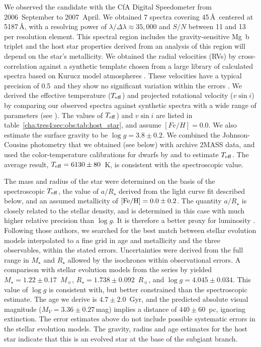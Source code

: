 We observed the candidate with the CfA Digital Speedometer \citep{Latham:ASP:1992a} from 2006~September to 2007~April. 
We obtained 7 spectra covering 45\,\AA\ centered 
at 5187\,\AA, with a resolving power of 
$\lambda/\Delta\lambda \approx 35,\!000$ and $S/N$ between 11 and 13 per resolution element. 
This spectral region includes the gravity-sensitive Mg~b triplet and the host star properties derived from an analysis of this region will depend on the star's metallicity. 
We obtained the radial velocities (RVs) by 
cross-correlation against a synthetic template chosen from a large library of 
calculated spectra based on Kurucz model atmospheres 
\citep[see][]{Nordstroem_Latham_Morse:aa:1994a, Latham_Stefanik_Torres:aj:2002a}. 
These velocities have a typical precision of 
0.5~\kms and they show no significant variation within the errors
. We derived the effective temperature ($T_{\rm eff}$) and projected rotational velocity ($v\sin{i}$) by comparing our observed spectra against synthetic spectra with a wide range of parameters (see \citealt*{Torres_Neuhauser_Guenther:aj:2002a}). The values of $T_{\rm eff}$) and $v \sin i$ are listed in table~\ref{cha:tres4:sec:obs:tab:host_star}, and assume $[Fe/H]=0.0$. We also estimate the surface gravity to be \mbox{$\log g = 3.8 \pm 0.2$}. 
We combined the Johnson-Cousins photometry that we obtained (see 
below) with archive 2MASS data, and used the 
color-temperature calibrations for dwarfs by \citet{Ramirez_Melendez:apj:2005b} and \citet*{Casagrande_Portinari_Flynn:mnras:2006a} to estimate 
$T_{\rm eff}$. The average result, $T_{\rm eff} = 6130 \pm 80$~K, 
is consistent with the spectroscopic value.

The mass and radius of the star were determined on the basis of the spectroscopic $T_{\rm eff}$, 
the value of $a/R_{\star}$ derived from the light curve fit described below, and 
an assumed metallicity of $\left [ {\rm Fe/H} \right ] = 0.0 \pm 0.2$. The 
quantity $a/R_{\star}$ is closely related to the stellar density, and is 
determined in this case with much higher relative precision than $\log g$. It 
is therefore a better proxy for luminosity \citep[see][]{Sozzetti_Torres_Charbonneau:apj:2007a}. 
Following those authors, we searched for the best match between stellar evolution models interpolated to a fine grid in age and metallicity and the three observables, 
within the stated errors. 
Uncertainties were derived from the full range in $M_\star$ and $R_\star$ allowed by the isochrones within observational errors.
A comparison with stellar evolution models from the series by \citet{Yi_Demarque_Kim:apjs:2001a} yielded \mbox{$M_{\star} = 1.22 \pm 0.17$~$M_{\sun}$}, \mbox{$R_{\star} = 1.738 \pm 0.092$~$R_{\sun}$}, and 
\mbox{$\log g = 4.045 \pm 0.034$}. This value of $\log g$ is consistent with, but 
better constrained than the spectroscopic estimate. The age we derive is 
$4.7 \pm 2.0$~Gyr, and the predicted absolute visual magnitude 
(\mbox{$M_V = 3.36 \pm 0.27$}\,mag) implies a distance of \mbox{$440 \pm 60$~pc}, ignoring extinction. 
The error estimates above do not include possible systematic errors in the stellar evolution models. 
The gravity, radius and age estimates for the host star indicate that this is an evolved star at the base of the subgiant branch.

